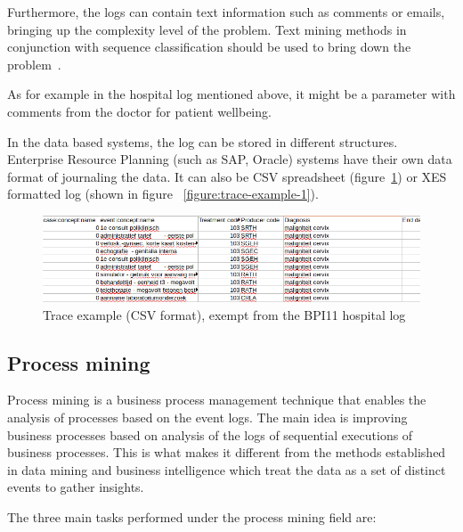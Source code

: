 Furthermore, the logs can contain text information such as comments or emails, bringing up the complexity level of the problem. Text mining methods in conjunction with sequence classification should be used to bring down the problem~\cite{DBLP:conf/bpm/TeinemaaDMF16}.

As for example in the hospital log mentioned above, it might be a parameter with comments from the doctor for patient wellbeing. 

In the data based systems, the log can be stored in different structures. Enterprise Resource Planning (such as SAP, Oracle) systems have their own data format of journaling the data. It can also be CSV spreadsheet (figure~\ref{figure:trace-example-2_csv}) or XES formatted log (shown in figure ~\ref{figure:trace-example-1}).  

\begin{figure}[!ht]
	\begin{center}  
		\includegraphics[width=\textwidth]{4_event_example_csv.png}
		\caption{Trace example (CSV format), exempt from the BPI11 hospital log~\cite{bpichallenge2011}}
		\label{figure:trace-example-2_csv}	
	\end{center}
\end{figure}



\subsection{Process mining}

Process mining is a business process management technique that enables the analysis of processes based on the event logs. The main idea is improving business processes based on analysis of the logs of sequential executions of business processes. This is what makes it different from the methods established in data mining and business intelligence which treat the data as a set of distinct events to gather insights. 

The three main tasks performed under the process mining field are:

